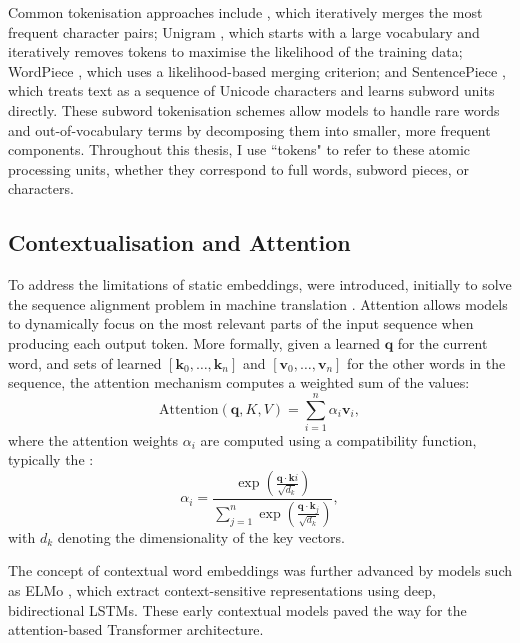 Common tokenisation approaches include  \citep{gage1994bpe, sennrich2016bpe}, which iteratively merges the most frequent character pairs; Unigram \citep{kudo2018unigram}, which starts with a large vocabulary and iteratively removes tokens to maximise the likelihood of the training data; WordPiece \citep{wu2016google}, which uses a likelihood-based merging criterion; and SentencePiece \citep{kudo2018sentencepiece}, which treats text as a sequence of Unicode characters and learns subword units directly. These subword tokenisation schemes allow models to handle rare words and out-of-vocabulary terms by decomposing them into smaller, more frequent components. Throughout this thesis, I use ``tokens" to refer to these atomic processing units, whether they correspond to full words, subword pieces, or characters.

\subsection{Contextualisation and Attention}
To address the limitations of static embeddings,  were introduced, initially to solve the sequence alignment problem in machine translation \citep{bahdanau2015neural,luong2015effective}. Attention allows models to dynamically focus on the most relevant parts of the input sequence when producing each output token. More formally, given a learned  $\mathbf{q}$ for the current word, and sets of learned  $[\mathbf{k}_0, \ldots, \mathbf{k}_n]$ and  $[\mathbf{v}_0, \ldots, \mathbf{v}_n]$ for the other words in the sequence, the attention mechanism computes a weighted sum of the values:
\begin{equation}
\text{Attention}(\mathbf{q}, K, V) = \sum_{i=1}^{n} \alpha_i \mathbf{v}_i,
\end{equation}
where the attention weights $\alpha_i$ are computed using a compatibility function, typically the :
\begin{equation}
\alpha_i = \frac{\exp\left(\frac{\mathbf{q} \cdot \mathbf{k}i}{\sqrt{d_k}}\right)}{\sum_{j=1}^{n} \exp\left(\frac{\mathbf{q} \cdot \mathbf{k}_j}{\sqrt{d_k}}\right)},
\end{equation}
with $d_k$ denoting the dimensionality of the key vectors. 

The concept of contextual word embeddings was further advanced by models such as ELMo \citep{peters2018deep}, which extract context-sensitive representations using deep, bidirectional LSTMs. These early contextual models paved the way for the attention-based Transformer architecture.

